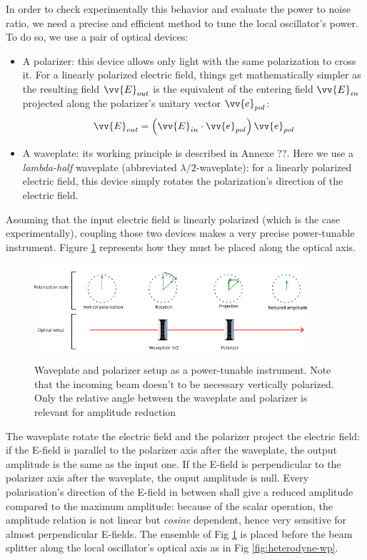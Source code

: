 \documentclass[12pt]{report}
\begin{document}
In order to check experimentally this behavior and evaluate the power to noise ratio, we need a precise and efficient method to tune the local oscillator's power. To do so, we use a pair of optical devices:
\begin{itemize}
	\item A polarizer: this device allows only light with the same polarization to cross it. For a linearly polarized electric field, things get mathematically simpler as the resulting field $\vv{E}_{out}$ is the equivalent of the entering field $\vv{E}_{in}$ projected along the polarizer's unitary vector $\vv{e}_{pol}$:
	\begin{equation}
	\vv{E}_{out} = \left( \vv{E}_{in} \cdot \vv{e}_{pol} \right) \vv{e}_{pol}
	\end{equation}
	\item A waveplate: its working principle is described in Annexe ??. Here we use a \textit{lambda-half} waveplate (abbreviated $\lambda/2$-waveplate): for a linearly polarized electric field, this device simply rotates the polarization's direction of the electric field.  
\end{itemize}

Assuming that the input electric field is linearly polarized (which is the case experimentally), coupling those two devices makes a very precise power-tunable instrument. Figure \ref{fig:wp-pol-setup} represents how they must be placed along the optical axis.

\begin{figure}[h!]
\caption{Waveplate and polarizer setup as a power-tunable instrument. Note that the incoming beam doesn't to be necessary vertically polarized. Only the relative angle between the waveplate and polarizer is relevant for amplitude reduction}
\centering
\includegraphics[width=0.9\textwidth]{wp-pol-setup}
\label{fig:wp-pol-setup}
\end{figure}

The waveplate rotate the electric field and the polarizer project the electric field: if the E-field is parallel to the polarizer axis after the waveplate, the output amplitude is the same as the input one. If the E-field is perpendicular to the polarizer axis after the waveplate, the ouput amplitude is null. Every polarisation's direction of the E-field in between shall give a reduced amplitude compared to the maximum amplitude: because of the scalar operation, the amplitude relation is not linear but \textit{cosine} dependent, hence very sensitive for almost perpendicular E-fields. The ensemble of Fig \ref{fig:wp-pol-setup} is placed before the beam splitter along the local oscillator's optical axis as in Fig \ref{fig:heterodyne-wp}.
\end{document}
